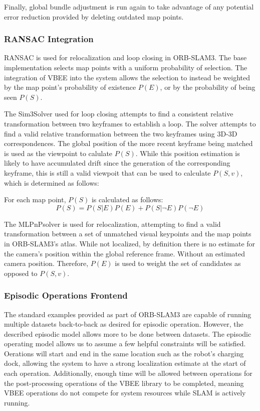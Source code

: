 Finally, global bundle adjustment is run again to take advantage of any potential error reduction provided by deleting outdated map points.

\subsubsection{RANSAC Integration}
\label{sec:orb_slam3_integration_RANSAC}

RANSAC is used for relocalization and loop closing in ORB-SLAM3. The base implementation selects map points with a uniform probability of selection. The integration of VBEE into the system allows the selection to instead be weighted by the map point's probability of existence $P(E)$, or by the probability of being seen $P(S)$.

The Sim3Solver used for loop closing attempts to find a consistent relative transformation between two keyframes to establish a loop. The solver attempts to find a valid relative transformation between the two keyframes using 3D-3D correspondences. The global position of the more recent keyframe being matched is used as the viewpoint to calulate $P(S)$. While this position estimation is likely to have accumulated drift since the generation of the corresponding keyframe, this is still a valid viewpoit that can be used to calculate $P(S,v)$, which is determined as follows:

For each map point, $P(S)$ is calculated as follows:
$$
P(S)=P(S|E)P(E)+P(S|\neg E)P(\neg E)
$$

The MLPnPsolver is used for relocalization, attempting to find a valid transformation between a set of unmatched visual keypoints and the map points in ORB-SLAM3's atlas. While not localized, by definition there is no estimate for the camera's position within the global reference frame. Without an estimated camera position. Therefore, $P(E)$ is used to weight the set of candidates as opposed to $P(S,v)$.

\subsubsection{Episodic Operations Frontend}

The standard examples provided as part of ORB-SLAM3 are capable of running multiple datasets back-to-back as desired for episodic operation. However, the described episodic model allows more to be done between datasets. The episodic operating model allows us to assume a few helpful constraints will be satisfied. Oerations will start and end in the same location such as the robot's charging dock, allowing the system to have a strong localization estimate at the start of each operation. Additionally, enough time will be allowed between operations for the post-processing operations of the VBEE library to be completed, meaning VBEE operations do not compete for system resources while SLAM is actively running.

